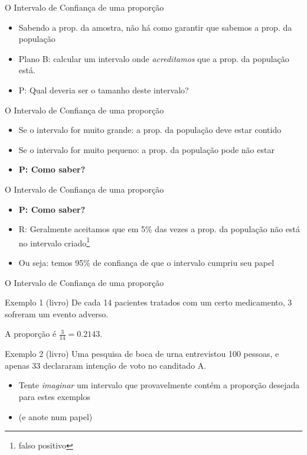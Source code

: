 \documentclass{beamer}
\begin{document}
\begin{frame}{\scriptsize O Intervalo de Confiança de uma proporção}
  \begin{itemize}
    \footnotesize
  \item<1> Sabendo a prop. da amostra, não há como garantir que sabemos a prop. da população
    \bigskip
  \item<2-> Plano B: calcular um intervalo onde {\em acreditamos} que a prop. da população está.
    \bigskip
  \item<3> P: Qual deveria ser o tamanho deste intervalo?
  \end{itemize}
\end{frame}

\begin{frame}{\scriptsize O Intervalo de Confiança de uma proporção}
  \begin{itemize}
    \footnotesize
  \item<1,3> Se o intervalo for muito grande: a prop. da população deve estar contido
  \item<2,3> Se o intervalo for muito pequeno: a prop. da população pode não estar
  \item<3> {\bf P: Como saber?}
  \end{itemize}
\end{frame}

\begin{frame}{\scriptsize O Intervalo de Confiança de uma proporção}
  \begin{itemize}
    \footnotesize
  \item {\bf P: Como saber?}
    \bigskip
  \item R: Geralmente aceitamos que em 5\% das vezes a prop. da população não está no intervalo criado\footnote{\scriptsize falso positivo}
  \item Ou seja: temos \alert{95\% de confiança} de que o intervalo cumpriu seu papel
  \end{itemize}
\end{frame}

\begin{frame}{\scriptsize O Intervalo de Confiança de uma proporção}
  \begin{exampleblock}{Exemplo 1 (livro)}
    \footnotesize
    De cada 14 pacientes tratados com um certo medicamento, 3 sofreram um evento adverso.

    A proporção é $\frac{3}{14} = 0.2143$.
  \end{exampleblock}
    \begin{exampleblock}{Exemplo 2 (livro)}
    \footnotesize
    Uma pesquisa de boca de urna entrevistou 100 pessoas, e apenas 33 declararam intenção de voto no canditado A.

  \end{exampleblock}
  \begin{itemize}
    \footnotesize
    \item Tente {\em imaginar} um intervalo que \alert{provavelmente contém} a proporção desejada para estes exemplos
    \item (e anote num papel)
  \end{itemize}
\end{frame}
\end{document}

